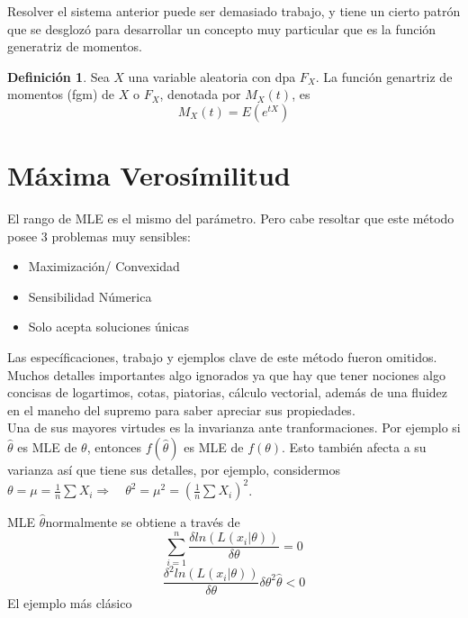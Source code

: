 \documentclass[11pt,a4paper,oneside]{report}
\theoremstyle{definition}
\newtheorem{definicion}{Definición}[chapter]
\theoremstyle{plain}
\theoremstyle{remark}
\begin{document}
Resolver el sistema anterior puede ser demasiado trabajo, y tiene un cierto patrón que se desglozó para desarrollar 
un concepto muy particular que es la función generatriz de momentos.\\

\begin{definicion}
  Sea $X$ una variable aleatoria con dpa $F_{X}$. La función genartriz de momentos (fgm) de 
  $X$ o $F_{X}$, denotada por $M_{X}(t)$, es
  \[M_{X}(t)=E(e^{tX})\] 
\end{definicion}


\section{Máxima Verosímilitud}



El rango de MLE es el mismo del parámetro. Pero cabe resoltar que este método posee 3 problemas muy sensibles:
\begin{itemize}
  \item Maximización/ Convexidad
  \item Sensibilidad Númerica
  \item Solo acepta soluciones únicas
\end{itemize}

Las específicaciones, trabajo y ejemplos clave de este método fueron omitidos. Muchos detalles importantes 
algo ignorados ya que hay que tener nociones algo concisas de logartimos, cotas, piatorias, cálculo vectorial, 
además de una fluidez en el maneho del supremo para saber apreciar sus propiedades.\\

Una de sus mayores virtudes es la invarianza ante tranformaciones. Por ejemplo si $\hat{\theta}$ es MLE de $\theta$,
entonces $f(\hat{\theta})$ es MLE de $f(\theta)$. Esto también afecta a su varianza así que tiene sus detalles, por ejemplo,
considermos $\theta = \mu = \frac{1}{n}\sum X_i\Rightarrow \quad \theta^2 = \mu^2 = (\frac{1}{n}\sum X_i)^2$.

MLE $\hat{\theta}$normalmente se obtiene a través de 
\[ \sum_{i=1}^{n} \frac{\delta ln(L(x_i|\theta))}{\delta \theta}=0 \]
\[ \frac{\delta^2 ln(L(x_i|\theta))}{\delta \theta}{\delta \theta^2} \hat{\theta}<0 \]
El ejemplo más clásico 
\end{document}
